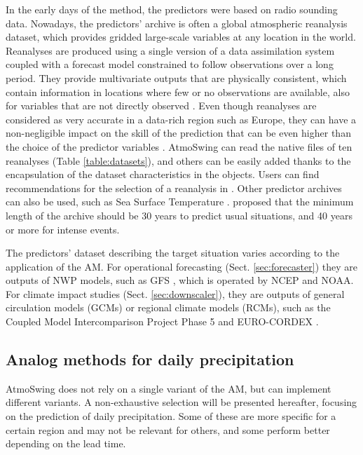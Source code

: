 \documentclass[review]{elsarticle}
\begin{document}
In the early days of the method, the predictors were based on radio sounding data. Nowadays, the predictors' archive is often a global atmospheric reanalysis dataset, which provides gridded large-scale variables at any location in the world. Reanalyses are produced using a single version of a data assimilation system coupled with a forecast model constrained to follow observations over a long period. They provide multivariate outputs that are physically consistent, which contain information in locations where few or no observations are available, also for variables that are not directly observed \citep{Gelaro2017}. Even though reanalyses are considered as very accurate in a data-rich region such as Europe, they can have a non-negligible impact on the skill of the prediction that can be even higher than the choice of the predictor variables \cite{Dayon2015, Horton2018b}. AtmoSwing can read the native files of ten reanalyses (Table \ref{table:datasets}), and others can be easily added thanks to the encapsulation of the dataset characteristics in the objects. Users can find recommendations for the selection of a reanalysis in \cite{Horton2018b}. Other predictor archives can also be used, such as Sea Surface Temperature \citep[SST, ][]{Reynolds2007}. \citet{Bontron2004} proposed that the minimum length of the archive should be 30 years to predict usual situations, and 40 years or more for intense events.

The predictors’ dataset describing the target situation varies according to the application of the AM. For operational forecasting (Sect. \ref{sec:forecaster}) they are outputs of NWP models, such as GFS \citep[Global Forecast System,][]{Kanamitsu1991, Kanamitsu1989}, which is operated by NCEP and NOAA. For climate impact studies (Sect. \ref{sec:downscaler}), they are outputs of general circulation models (GCMs) or regional climate models (RCMs), such as the Coupled Model Intercomparison Project Phase 5 \citep[CMIP5,][]{Taylor2012} and EURO-CORDEX \citep{Jacob2014}.


\subsection{Analog methods for daily precipitation}
\label{sec:method}

AtmoSwing does not rely on a single variant of the AM, but can implement different variants. A non-exhaustive selection will be presented hereafter, focusing on the prediction of daily precipitation. Some of these are more specific for a certain region and may not be relevant for others, and some perform better depending on the lead time.
\end{document}
